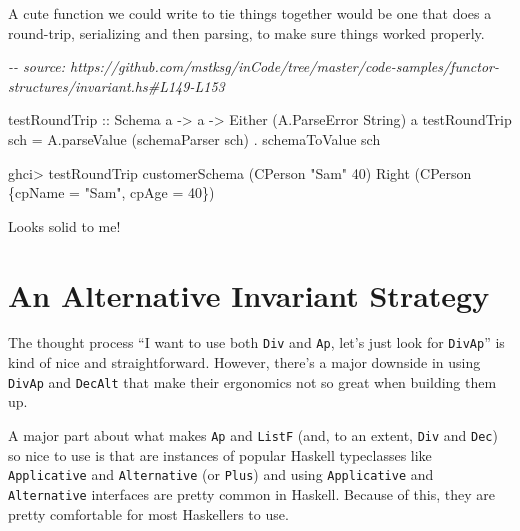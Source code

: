 \documentclass[]{article}
\newenvironment{Shaded}{}{}
\newcommand{\CommentTok}[1]{\textcolor[rgb]{0.38,0.63,0.69}{\textit{#1}}}
\newcommand{\DataTypeTok}[1]{\textcolor[rgb]{0.56,0.13,0.00}{#1}}
\newcommand{\DecValTok}[1]{\textcolor[rgb]{0.25,0.63,0.44}{#1}}
\newcommand{\NormalTok}[1]{#1}
\newcommand{\OperatorTok}[1]{\textcolor[rgb]{0.40,0.40,0.40}{#1}}
\newcommand{\OtherTok}[1]{\textcolor[rgb]{0.00,0.44,0.13}{#1}}
\newcommand{\StringTok}[1]{\textcolor[rgb]{0.25,0.44,0.63}{#1}}
\begin{document}
A cute function we could write to tie things together would be one that does a
round-trip, serializing and then parsing, to make sure things worked properly.

\begin{Shaded}
\begin{Highlighting}[]
\CommentTok{{-}{-} source: https://github.com/mstksg/inCode/tree/master/code{-}samples/functor{-}structures/invariant.hs\#L149{-}L153}

\NormalTok{testRoundTrip}
\OtherTok{    ::} \DataTypeTok{Schema}\NormalTok{ a}
    \OtherTok{{-}>}\NormalTok{ a}
    \OtherTok{{-}>} \DataTypeTok{Either}\NormalTok{ (}\DataTypeTok{A.ParseError} \DataTypeTok{String}\NormalTok{) a}
\NormalTok{testRoundTrip sch }\OtherTok{=}\NormalTok{ A.parseValue (schemaParser sch) }\OperatorTok{.}\NormalTok{ schemaToValue sch}
\end{Highlighting}
\end{Shaded}

\begin{Shaded}
\begin{Highlighting}[]
\NormalTok{ghci}\OperatorTok{>}\NormalTok{ testRoundTrip customerSchema (}\DataTypeTok{CPerson} \StringTok{"Sam"} \DecValTok{40}\NormalTok{)}
\DataTypeTok{Right}\NormalTok{ (}\DataTypeTok{CPerson}\NormalTok{ \{cpName }\OtherTok{=} \StringTok{"Sam"}\NormalTok{, cpAge }\OtherTok{=} \DecValTok{40}\NormalTok{\})}
\end{Highlighting}
\end{Shaded}

Looks solid to me!

\hypertarget{an-alternative-invariant-strategy}{%
\section{An Alternative Invariant
Strategy}\label{an-alternative-invariant-strategy}}

The thought process ``I want to use both \texttt{Div} and \texttt{Ap}, let's
just look for \texttt{DivAp}'' is kind of nice and straightforward. However,
there's a major downside in using \texttt{DivAp} and \texttt{DecAlt} that make
their ergonomics not so great when building them up.

A major part about what makes \texttt{Ap} and \texttt{ListF} (and, to an extent,
\texttt{Div} and \texttt{Dec}) so nice to use is that are instances of popular
Haskell typeclasses like \texttt{Applicative} and \texttt{Alternative} (or
\texttt{Plus}) and using \texttt{Applicative} and \texttt{Alternative}
interfaces are pretty common in Haskell. Because of this, they are pretty
comfortable for most Haskellers to use.
\end{document}
